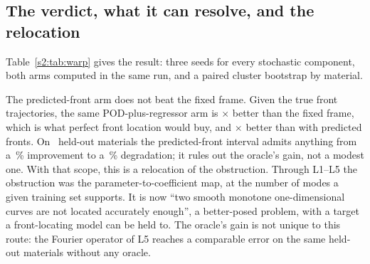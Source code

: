 \subsection{The verdict, what it can resolve, and the relocation}

Table~\ref{s2:tab:warp} gives the result: three seeds for every stochastic component, both
arms computed in the same run, and a paired cluster bootstrap by material.

\begin{table}[t]
\centering
\caption{The two-front frame against the fixed frame (legacy design). Differences are
the fixed frame's nRMSE minus the arm's, so positive means the arm is better; CI is the
cluster-bootstrap confidence interval. The oracle arm is handed the true front
trajectories and is \emph{not} comparable with any arm that is not; it sizes the
remaining headroom and is not a result.}
\label{s2:tab:warp}
\end{table}

The predicted-front arm does not beat the fixed frame. Given the true front
trajectories, the same POD-plus-regressor arm is \nWarpHeadroomFixed{}\(\times\) better
than the fixed frame, which is what perfect front location would buy, and
\nWarpHeadroom{}\(\times\) better than with predicted fronts. On \nWarpNmat\ held-out
materials the predicted-front interval admits anything from a \nWarpPredImproveMax\,\%
improvement to a \nWarpPredDegradeMax\,\% degradation; it rules out the oracle's gain,
not a modest one. With that scope, this is a relocation of the obstruction. Through L1--L5 the obstruction was the
parameter-to-coefficient map, at the number of modes a given training set supports. It
is now ``two smooth monotone one-dimensional curves are not located accurately
enough'', a better-posed problem, with a target a front-locating model can be held
to. The oracle's gain is not unique to this route: the Fourier operator of L5 reaches a
comparable error on the same held-out materials without any oracle.

